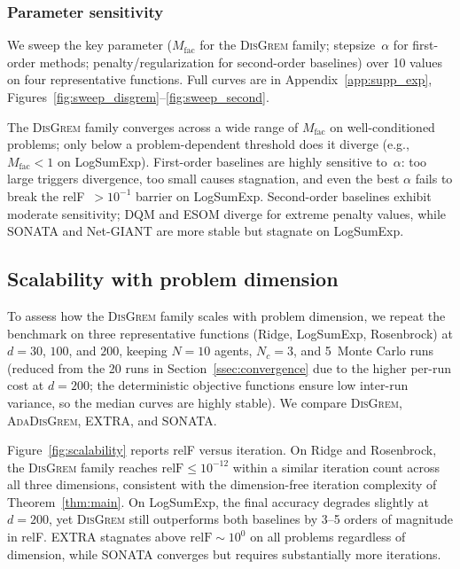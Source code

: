 \documentclass[review,onefignum,onetabnum]{siamart171218}
\begin{document}
	\subsubsection{Parameter sensitivity}

	We sweep the key parameter ($M_{\mathrm{fac}}$ for the
	\textsc{DisGrem} family; stepsize~$\alpha$ for first-order methods;
	penalty/regularization for second-order baselines) over 10 values
	on four representative functions.
	Full curves are in Appendix~\ref{app:supp_exp},
	Figures~\ref{fig:sweep_disgrem}--\ref{fig:sweep_second}.

	The \textsc{DisGrem} family converges across a wide range of
	$M_{\mathrm{fac}}$ on well-conditioned problems; only below a
	problem-dependent threshold does it diverge (e.g., $M_{\mathrm{fac}}{<}1$
	on LogSumExp).
	First-order baselines are highly sensitive to~$\alpha$: too large
	triggers divergence, too small causes stagnation, and even the
	best $\alpha$ fails to break the relF~$>10^{-1}$ barrier on
	LogSumExp.
	Second-order baselines exhibit moderate sensitivity; DQM and ESOM
	diverge for extreme penalty values, while SONATA and Net-GIANT are
	more stable but stagnate on LogSumExp.
	
	\FloatBarrier
	
	\subsection{Scalability with problem dimension}\label{ssec:scalability}

	To assess how the \textsc{DisGrem} family scales with problem
	dimension, we repeat the benchmark on three representative functions
	(Ridge, LogSumExp, Rosenbrock) at $d=30$, $100$, and $200$, keeping
	$N=10$ agents, $N_c=3$, and 5~Monte Carlo runs
	(reduced from the 20 runs in Section~\ref{ssec:convergence}
	due to the higher per-run cost at $d{=}200$;
	the deterministic objective functions ensure low inter-run variance,
	so the median curves are highly stable).
	We compare \textsc{DisGrem}, \textsc{AdaDisGrem}, EXTRA, and SONATA.

	Figure~\ref{fig:scalability} reports relF versus iteration.
	On Ridge and Rosenbrock, the \textsc{DisGrem} family reaches
	$\mathrm{relF}\le 10^{-12}$ within a similar iteration count across
	all three dimensions, consistent with the dimension-free iteration
	complexity of Theorem~\ref{thm:main}.
	On LogSumExp, the final accuracy degrades slightly at $d=200$, yet
	\textsc{DisGrem} still outperforms both baselines by 3--5 orders
	of magnitude in relF.
	EXTRA stagnates above $\mathrm{relF}\sim 10^{0}$ on all problems
	regardless of dimension, while SONATA converges but requires
	substantially more iterations.
\end{document}
